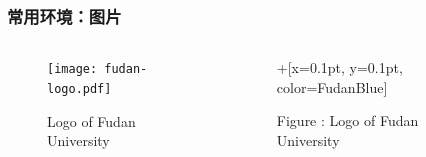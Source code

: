 \begin{frame}[fragile]
\frametitle{常用环境：图片}
\begin{columns}
\begin{column}{0.6\textwidth}
  \begin{texcode}[gobble=4, moretexcs={\graphicspath,\includegraphics},
      emph={[1]figure}, emph={[2]graphicx}]
    \usepackage{graphicx}
    \graphicspath{{./images/}}

    \begin{figure}
      \centering
      \texttt{[image: fudan-logo.pdf]}
      \caption{Logo of Fudan University}
      \label{fig:fudan-logo}
    \end{figure}
  \end{texcode}
\end{column}
\pause
\begin{column}{0.3\textwidth}
  \begin{figure}
    \centering
    \fduemblem+[x=0.1pt, y=0.1pt, color=FudanBlue]
    \caption{\textcolor{keyword}{Figure \thefigure:} Logo of Fudan University}
    \label{fig:fudan-logo_}  %
  \end{figure}
\end{column}
\end{columns}
\end{frame}

